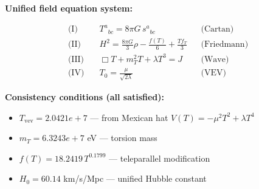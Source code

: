 
\textbf{Unified field equation system:}

\begin{align}
  \text{(I)} \quad & T^a{}_{bc} = 8\pi G \, s^a{}_{bc} && \text{(Cartan)} \\
  \text{(II)} \quad & H^2 = \frac{8\pi G}{3}\rho - \frac{f(T)}{6} + \frac{Tf_T}{3} && \text{(Friedmann)} \\
  \text{(III)} \quad & \Box T + m_T^2 T + \lambda T^3 = J && \text{(Wave)} \\
  \text{(IV)} \quad & T_0 = \frac{\mu}{\sqrt{2\lambda}} && \text{(VEV)}
\end{align}

\textbf{Consistency conditions (all satisfied):}
\begin{itemize}
  \item $T_{\text{vev}} = 2.0421e+7$ — from Mexican hat $V(T) = -\mu^2 T^2 + \lambda T^4$
  \item $m_T = 6.3243e+7$ eV — torsion mass
  \item $f(T) = 18.2419 \, T^{0.1799}$ — teleparallel modification
  \item $H_0 = 60.14$ km/s/Mpc — unified Hubble constant
\end{itemize}